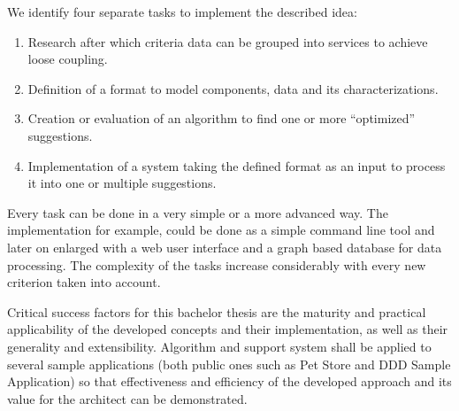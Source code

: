 We identify four separate tasks to implement the described idea:
\begin{enumerate}
	\item Research after which criteria data can be grouped into services to achieve loose coupling.
	\item Definition of a format to model components, data and its characterizations.
	\item Creation or evaluation of an algorithm to find one or more \enquote{optimized} suggestions.
	\item Implementation of a system taking the defined format as an input to process it into one or multiple suggestions.
\end{enumerate}
Every task can be done in a very simple or a more advanced way. The implementation for example, could be done as a simple command line tool and later on enlarged with a web user interface and a graph based database for data processing. The complexity of the tasks increase considerably with every new criterion taken into account.

Critical success factors for this bachelor thesis are the maturity and practical applicability of the developed concepts and their implementation, as well as their generality and extensibility.  Algorithm and support system shall be applied to several sample applications (both public ones such as Pet Store and DDD Sample Application) so that effectiveness and efficiency of the developed approach and its value for the architect can be demonstrated. 
